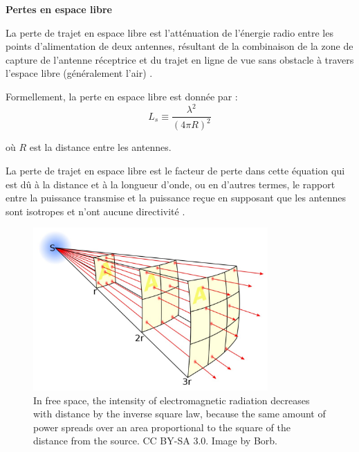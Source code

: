 \textbf{Pertes en espace libre}

La perte de trajet en espace libre est l'atténuation de l'énergie radio entre les points d'alimentation de deux antennes, résultant de la combinaison de la zone de capture de l'antenne réceptrice et du trajet en ligne de vue sans obstacle à travers l'espace libre (généralement l'air) \cite{wikipedia}.

Formellement, la perte en espace libre est donnée par :
\begin{equation}
    L_s \equiv \frac{\lambda^2}{(4\pi R)^2}
\end{equation}

où \( R \) est la distance entre les antennes.  

La perte de trajet en espace libre est le facteur de perte dans cette équation qui est dû à la distance et à la longueur d'onde, ou en d'autres termes, le rapport entre la puissance transmise et la puissance reçue en supposant que les antennes sont isotropes et n'ont aucune directivité \cite{wikipedia}.

\begin{figure}[H] %
    \centering
    \includegraphics[width=0.8\textwidth]{figures/6-56.jpg}
    
    \caption{In free space, the intensity of electromagnetic radiation decreases with distance by the inverse square law, because the same amount of power spreads over an area proportional to the square of the distance from the source. CC BY-SA 3.0. Image by Borb.}
    \label{fig:communication2}
\end{figure}

